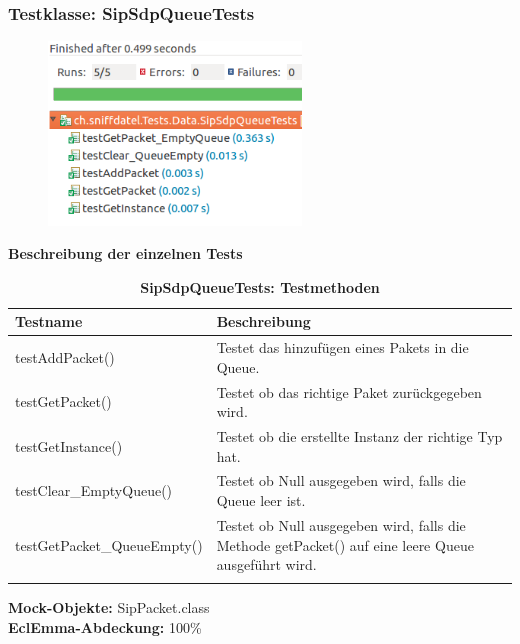 \documentclass[a4,12pt]{scrartcl}
\begin{document}
\subsubsection{Testklasse: SipSdpQueueTests}
\begin{figure} [H]
	\begin{center}
	\includegraphics[width=0.60\textwidth]{./pictures/SipSdpQueueTests.png}
	\label{Bild Referenz}
	\end{center}
\end{figure}

\textbf{Beschreibung der einzelnen Tests}
\begin{longtable}{ p{7cm} p{7cm} }  
    {Testname} & {Beschreibung}\\ \midrule
    testAddPacket() & Testet das hinzufügen eines Pakets in die Queue.\\ \addlinespace
    testGetPacket() & Testet ob das richtige Paket zurückgegeben wird.\\ \addlinespace
    testGetInstance() & Testet ob die erstellte Instanz der richtige Typ hat.\\ \addlinespace
    testClear\_EmptyQueue() &  Testet ob Null ausgegeben wird, falls die Queue leer ist.\\ \addlinespace
    testGetPacket\_QueueEmpty() & Testet ob Null ausgegeben wird, falls die Methode getPacket() auf eine leere Queue ausgeführt wird. \\
\caption{\textbf{SipSdpQueueTests: Testmethoden}}
\end{longtable}

\noindent \textbf{Mock-Objekte:} SipPacket.class \\
\textbf{EclEmma-Abdeckung:} 100\%
\end{document}

